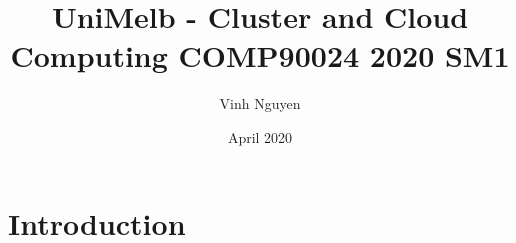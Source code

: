 \documentclass{article}
\title{UniMelb - Cluster and Cloud Computing COMP90024 2020 SM1}
\author{Vinh Nguyen}
\date{April 2020}
\begin{document}
\maketitle

\section{Introduction}
\end{document}
